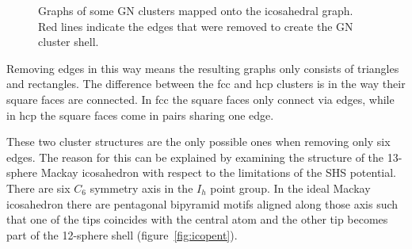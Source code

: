 \begin{figure}
    \centering
    \hspace{0.03\textwidth}
    \hspace{0.03\textwidth}
    \caption{Graphs of some \ac{GN} clusters mapped onto the icosahedral graph.
    Red lines indicate the edges that were removed to create the \ac{GN}
    cluster shell.}
    \label{fig:GNshellgraphs}
\end{figure}

Removing edges in this way means the resulting graphs only consists of
triangles and rectangles. The difference between the \ac{fcc} and hcp clusters
is in the way their square faces are connected. In \ac{fcc} the square faces
only connect via edges, while in hcp the square faces come in pairs sharing one
edge. 

These two cluster structures are the only possible ones when removing only six
edges. The reason for this can be explained by examining the structure of the
13-sphere Mackay icosahedron with respect to the limitations of the \ac{SHS}
potential. There are six $C_6$ symmetry axis in the $I_h$ point group. In the
ideal Mackay icosahedron there are pentagonal bipyramid motifs aligned along
those axis such that one of the tips coincides with the central atom and the
other tip becomes part of the 12-sphere shell (figure~\ref{fig:icopent}). 

